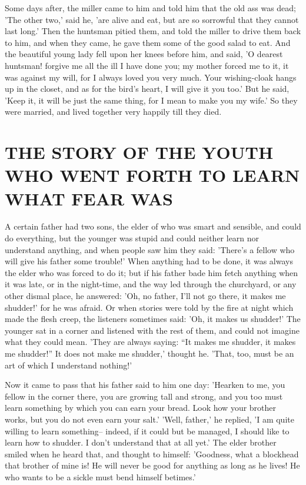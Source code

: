 \documentclass[12pt]{book}
\begin{document}
Some days after, the miller came to him and told him that the old ass
was dead; 'The other two,' said he, 'are alive and eat, but are so
sorrowful that they cannot last long.' Then the huntsman pitied them,
and told the miller to drive them back to him, and when they came, he
gave them some of the good salad to eat. And the beautiful young lady
fell upon her knees before him, and said, 'O dearest huntsman! forgive
me all the ill I have done you; my mother forced me to it, it was
against my will, for I always loved you very much. Your wishing-cloak
hangs up in the closet, and as for the bird's heart, I will give it
you too.' But he said, 'Keep it, it will be just the same thing, for I
mean to make you my wife.' So they were married, and lived together
very happily till they died.



\chapter[THE STORY OF THE YOUTH WHO WENT\ldots]{THE STORY OF THE YOUTH WHO WENT FORTH TO LEARN WHAT FEAR WAS}

A certain father had two sons, the elder of who was smart and
sensible, and could do everything, but the younger was stupid and
could neither learn nor understand anything, and when people saw him
they said: 'There's a fellow who will give his father some trouble!'
When anything had to be done, it was always the elder who was forced
to do it; but if his father bade him fetch anything when it was late,
or in the night-time, and the way led through the churchyard, or any
other dismal place, he answered: 'Oh, no father, I'll not go there, it
makes me shudder!' for he was afraid. Or when stories were told by the
fire at night which made the flesh creep, the listeners sometimes
said: 'Oh, it makes us shudder!' The younger sat in a corner and
listened with the rest of them, and could not imagine what they could
mean. 'They are always saying: ``It makes me shudder, it makes me
shudder!'' It does not make me shudder,' thought he. 'That, too, must
be an art of which I understand nothing!'

Now it came to pass that his father said to him one day: 'Hearken to
me, you fellow in the corner there, you are growing tall and strong,
and you too must learn something by which you can earn your bread.
Look how your brother works, but you do not even earn your salt.'
'Well, father,' he replied, 'I am quite willing to learn something--
indeed, if it could but be managed, I should like to learn how to
shudder. I don't understand that at all yet.' The elder brother smiled
when he heard that, and thought to himself: 'Goodness, what a
blockhead that brother of mine is! He will never be good for anything
as long as he lives! He who wants to be a sickle must bend himself
betimes.'
\end{document}
